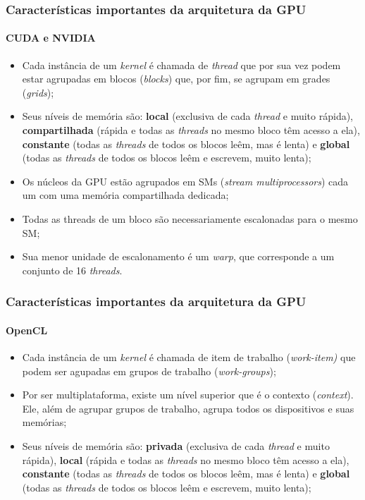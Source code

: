 \documentclass[brazil, 10pt]{beamer}
\begin{document}
\begin{frame}
  \frametitle{Características importantes da arquitetura da GPU}
  \framesubtitle{CUDA e NVIDIA}
  
  \begin{itemize}
    \item Cada instância de um \textit{kernel} é chamada de \textit{thread} que por sua vez podem estar agrupadas em blocos (\textit{blocks}) que, por fim, se agrupam em grades (\textit{grids});
    \item Seus níveis de memória são: \textbf{local} (exclusiva de cada \textit{thread} e muito rápida), \textbf{compartilhada} (rápida e todas as \textit{threads} no mesmo bloco têm acesso a ela), \textbf{constante} (todas as \textit{threads} de todos os blocos leêm, mas é lenta) e \textbf{global} (todas as \textit{threads} de todos os blocos leêm e escrevem, muito lenta);
    \item Os núcleos da GPU estão agrupados em SMs (\textit{stream multiprocessors}) cada um com uma memória compartilhada dedicada;
    \item Todas as threads de um bloco são necessariamente escalonadas para o mesmo SM;
    \item Sua menor unidade de escalonamento é um \textit{warp}, que corresponde a um conjunto de 16 \textit{threads}.
  \end{itemize}

\end{frame}

\begin{frame}
  \frametitle{Características importantes da arquitetura da GPU}
  \framesubtitle{OpenCL}
  
  \begin{itemize}
    \item Cada instância de um \textit{kernel} é chamada de item de trabalho (\textit{work-item)} que podem ser agupadas em grupos de trabalho (\textit{work-groups});
    \item Por ser multiplataforma, existe um nível superior que é o contexto (\textit{context}). Ele, além de agrupar grupos de trabalho, agrupa todos os dispositivos e suas memórias;
    \item Seus níveis de memória são: \textbf{privada} (exclusiva de cada \textit{thread} e muito rápida), \textbf{local} (rápida e todas as \textit{threads} no mesmo bloco têm acesso a ela), \textbf{constante} (todas as \textit{threads} de todos os blocos leêm, mas é lenta) e \textbf{global} (todas as \textit{threads} de todos os blocos leêm e escrevem, muito lenta);
  \end{itemize}

\end{frame}
\end{document}

